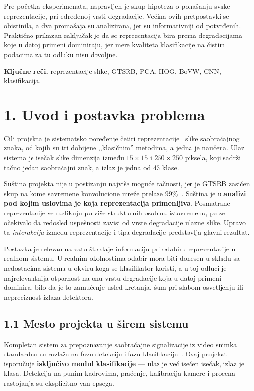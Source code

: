 \documentclass[11pt,a4paper]{article}
\begin{document}
Pre početka eksperimenata, napravljen je skup hipoteza o ponašanju svake reprezentacije, pri određenoj
vrsti degradacije. Većina ovih pretpostavki se obistinila, a dva promašaja su analizirana, jer
su informativniji od potvrđenih. Praktično prikazan zaključak je da se reprezentacija bira prema 
degradacijama koje u datoj primeni dominiraju, jer mere kvaliteta klasifikacije na čistim podacima za tu odluku nisu
dovoljne.

\textbf{Ključne reči:} reprezentacije slike, GTSRB, PCA, HOG, BoVW, CNN, klasifikacija.

\newpage

\section*{1. Uvod i postavka problema}

Cilj projekta je sistematsko poređenje četiri reprezentacije~\cite{repr-learning} slike
saobraćajnog znaka, od kojih su tri dobijene ,,klasičnim'' metodima, a jedna je naučena.
Ulaz sistema je isečak slike dimenzija između $15\times15$ i $250\times250$ piksela, koji
sadrži tačno jedan saobraćajni znak, a izlaz je jedna od 43 klase.

Suština projekta nije u postizanju najviše moguće tačnosti, jer je GTSRB zasićen skup na kome
savremene konvolucione mreže prelaze $99\%$~\cite{ciresan}. Suština je u \textbf{analizi pod
kojim uslovima je koja reprezentacija primenljiva}. Posmatrane reprezentacije se razlikuju po
više strukturnih osobina istovremeno, pa se očekivalo da redosled uspešnosti zavisi od vrste
degradacije ulazne slike. Upravo ta \textit{interakcija} između reprezentacije i tipa
degradacije predstavlja glavni rezultat.

Postavka je relevantna zato što daje informaciju pri odabiru reprezentacije u realnom sistemu.
U realnim okolnostima odabir mora biti donesen u skladu sa nedostacima sistema u okviru koga
se klasifikator koristi, a u toj odluci je najrelevantnija otpornost na onu vrstu degradacije
koja u datoj primeni dominira, bilo da je to zamućenje usled kretanja, šum pri slabom
osvetljenju ili nepreciznost izlaza detektora.

\subsection*{1.1 Mesto projekta u širem sistemu}

Kompletan sistem za prepoznavanje saobraćajne signalizacije iz video snimka standardno se
razlaže na fazu detekcije i fazu klasifikacije~\cite{tsr-survey, gtsdb}. Ovaj projekat
isporučuje \textbf{isključivo modul klasifikacije} — ulaz je već isečen isečak, izlaz je klasa.
Detekcija na punim kadrovima, praćenje, kalibracija kamere i procena rastojanja su eksplicitno
van opsega.
\end{document}
